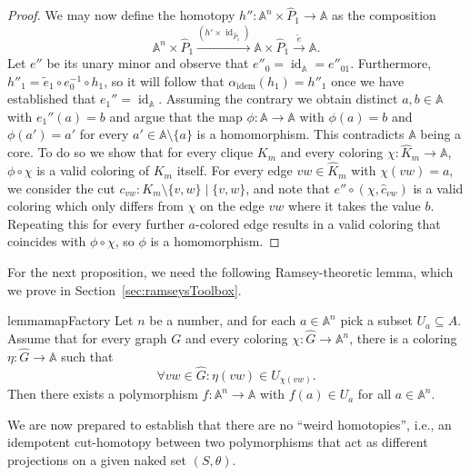 \documentclass[oneside]{amsart}
\newcommand{\str}[1]{\mathbb{#1}}
\newcommand{\idem}{\mathrm{idem}}
\DeclareMathOperator{\id}{id}
\begin{document}
\begin{proof}
    We may now define the homotopy $h''\colon \str A^n \times \hat P_1 \to \str A$ as the composition
    \begin{equation*}
        \str A^n \times \hat P_1 \xrightarrow{(h'\times\id_{\hat P_1})} \str A \times \hat P_1 \xrightarrow{\tilde e}  \str A.
    \end{equation*}
    Let $e''$ be its unary minor and observe that $e''_{0} = \id_{\str A} = e''_{01}$.
    Furthermore, $h''_1 = \tilde e_1 \circ e_0^{-1} \circ h_1$, so it will follow that $\alpha_{\idem}(h_1)  = h''_1$ once we have established that $e_1'' = \id_{\str A}$.
    Assuming the contrary we obtain distinct $a,b\in \str A$ with $e_{1}''(a) = b$ and argue that the map $\phi\colon \str A \to \str A$ with $\phi(a)=b$ and $\phi(a')=a'$ for every $a'\in \str A\setminus \{a\}$ is a homomorphism. This contradicts $\str A$ being a core.
    To do so we show that for every clique $K_m$ and every coloring $\chi\colon \hat K_m\to \str A$, $\phi \circ \chi$ is a valid coloring of $K_m$ itself.
    For every edge $vw \in \hat K_m$ with $\chi(vw)=a$, we consider the cut $c_{vw}\colon K_m\setminus \{v,w\}\mid \{v,w\}$, and note that $e''\circ (\chi, \hat c_{vw})$ is a valid coloring which only differs from $\chi$ on the edge $vw$ where it takes the value $b$.
    Repeating this for every further $a$-colored edge results in a valid coloring that coincides with $\phi\circ \chi$, so $\phi$ is a homomorphism. 
\end{proof}

For the next proposition, we need the following Ramsey-theoretic lemma, which we prove in Section~\ref{sec:ramseysToolbox}.

\begin{restatable}{lemma}{mapFactory}
\label{lem:mapFactory}
    Let $n$ be a number, and for each $a\in \str A^n$ pick a subset $U_{a}\subseteq A$. Assume that for every graph $G$ and every coloring $\chi\colon \hat G\to \str A^n$, there is a coloring $\eta\colon \hat G\to \str A$ such that 
    \begin{equation*}
        \forall vw\in\hat G: \eta(vw)\in U_{\chi(vw)}.
    \end{equation*}
    Then there exists a polymorphism 
    $f \colon \str A^n \to \str A$ 
    with $f(a)\in U_{a}$ for all $a \in \str A^n$.
\end{restatable}

We are now prepared to establish that there are no ``weird homotopies'', i.e., an idempotent cut-homotopy between two polymorphisms that act as different projections on a given naked set $(S,\theta)$.
\end{document}
